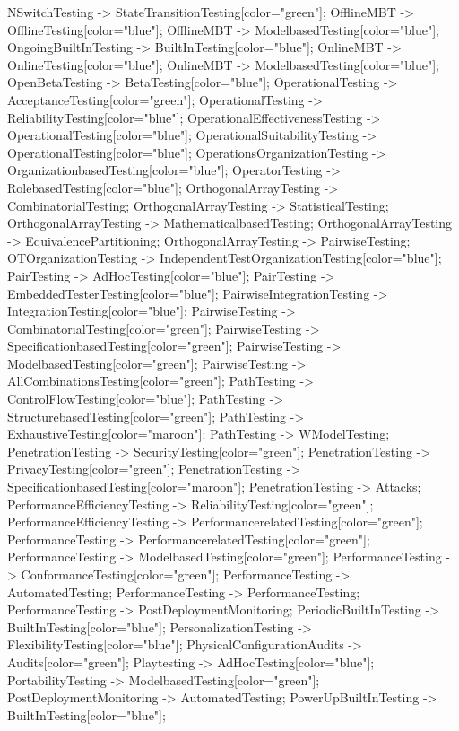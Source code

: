 \documentclass{article}
\begin{document}
{NSwitchTesting -> StateTransitionTesting[color="green"];
OfflineMBT -> OfflineTesting[color="blue"];
OfflineMBT -> ModelbasedTesting[color="blue"];
OngoingBuiltInTesting -> BuiltInTesting[color="blue"];
OnlineMBT -> OnlineTesting[color="blue"];
OnlineMBT -> ModelbasedTesting[color="blue"];
OpenBetaTesting -> BetaTesting[color="blue"];
OperationalTesting -> AcceptanceTesting[color="green"];
OperationalTesting -> ReliabilityTesting[color="blue"];
OperationalEffectivenessTesting -> OperationalTesting[color="blue"];
OperationalSuitabilityTesting -> OperationalTesting[color="blue"];
OperationsOrganizationTesting -> OrganizationbasedTesting[color="blue"];
OperatorTesting -> RolebasedTesting[color="blue"];
OrthogonalArrayTesting -> CombinatorialTesting;
OrthogonalArrayTesting -> StatisticalTesting;
OrthogonalArrayTesting -> MathematicalbasedTesting;
OrthogonalArrayTesting -> EquivalencePartitioning;
OrthogonalArrayTesting -> PairwiseTesting;
OTOrganizationTesting -> IndependentTestOrganizationTesting[color="blue"];
PairTesting -> AdHocTesting[color="blue"];
PairTesting -> EmbeddedTesterTesting[color="blue"];
PairwiseIntegrationTesting -> IntegrationTesting[color="blue"];
PairwiseTesting -> CombinatorialTesting[color="green"];
PairwiseTesting -> SpecificationbasedTesting[color="green"];
PairwiseTesting -> ModelbasedTesting[color="green"];
PairwiseTesting -> AllCombinationsTesting[color="green"];
PathTesting -> ControlFlowTesting[color="blue"];
PathTesting -> StructurebasedTesting[color="green"];
PathTesting -> ExhaustiveTesting[color="maroon"];
PathTesting -> WModelTesting;
PenetrationTesting -> SecurityTesting[color="green"];
PenetrationTesting -> PrivacyTesting[color="green"];
PenetrationTesting -> SpecificationbasedTesting[color="maroon"];
PenetrationTesting -> Attacks;
PerformanceEfficiencyTesting -> ReliabilityTesting[color="green"];
PerformanceEfficiencyTesting -> PerformancerelatedTesting[color="green"];
PerformanceTesting -> PerformancerelatedTesting[color="green"];
PerformanceTesting -> ModelbasedTesting[color="green"];
PerformanceTesting -> ConformanceTesting[color="green"];
PerformanceTesting -> AutomatedTesting;
PerformanceTesting -> PerformanceTesting;
PerformanceTesting -> PostDeploymentMonitoring;
PeriodicBuiltInTesting -> BuiltInTesting[color="blue"];
PersonalizationTesting -> FlexibilityTesting[color="blue"];
PhysicalConfigurationAudits -> Audits[color="green"];
Playtesting -> AdHocTesting[color="blue"];
PortabilityTesting -> ModelbasedTesting[color="green"];
PostDeploymentMonitoring -> AutomatedTesting;
PowerUpBuiltInTesting -> BuiltInTesting[color="blue"];
}
\end{document}
